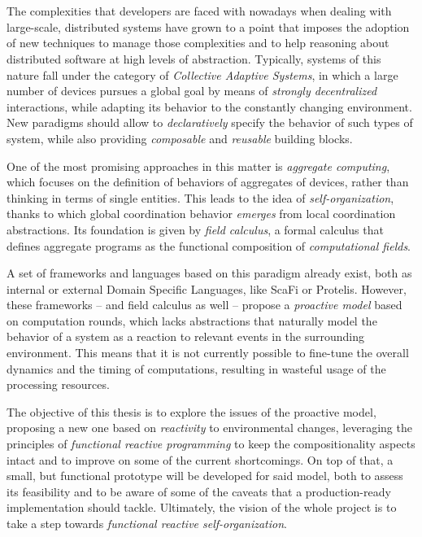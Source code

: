 \chapter{\introductionname}

The complexities that developers are faced with nowadays when dealing with large-scale, distributed systems have grown to a point that imposes the adoption of new techniques to manage those complexities and to help reasoning about distributed software at high levels of abstraction.
%
Typically, systems of this nature fall under the category of \textit{Collective Adaptive Systems}, in which a large number of devices pursues a global goal by means of \textit{strongly decentralized} interactions, while adapting its behavior to the constantly changing environment.
%
New paradigms should allow to \textit{declaratively} specify the behavior of such types of system, while also providing \textit{composable} and \textit{reusable} building blocks.

One of the most promising approaches in this matter is \textit{aggregate computing}, which focuses on the definition of behaviors of aggregates of devices, rather than thinking in terms of single entities.
%
This leads to the idea of \textit{self-organization}, thanks to which global coordination behavior \textit{emerges} from local coordination abstractions.
%
Its foundation is given by \textit{field calculus}, a formal calculus that defines aggregate programs as the functional composition of \textit{computational fields}.

A set of frameworks and languages based on this paradigm already exist, both as internal or external Domain Specific Languages, like ScaFi or Protelis.
%
However, these frameworks -- and field calculus as well -- propose a \textit{proactive model} based on computation rounds, which lacks abstractions that naturally model the behavior of a system as a reaction to relevant events in the surrounding environment.
%
This means that it is not currently possible to fine-tune the overall dynamics and the timing of computations, resulting in wasteful usage of the processing resources.

The objective of this thesis is to explore the issues of the proactive model, proposing a new one based on \textit{reactivity} to environmental changes, leveraging the principles of \textit{functional reactive programming} to keep the compositionality aspects intact and to improve on some of the current shortcomings.
%
On top of that, a small, but functional prototype will be developed for said model, both to assess its feasibility and to be aware of some of the caveats that a production-ready implementation should tackle.
%
Ultimately, the vision of the whole project is to take a step towards \textit{functional reactive self-organization}.

